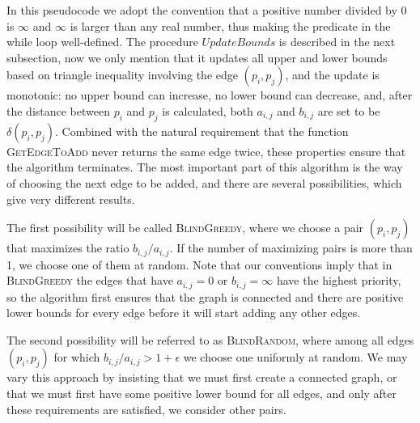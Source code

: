 \documentclass[a4paper,USenglish]{socg-lipics-v2018}
\newcommand{\eps}{\epsilon}
\newcommand{\dist}{\delta}
\begin{document}
\begin{algorithmic}
\label{alg:blind_spanner}
\Function{BlindSpanner}{$P, \eps$}
    \While {$\exists i \neq j : b_{i,j} / a_{i,j} > 1 + \eps$}
        \State {$(i,j) \gets$ \Call {GetEdgeToAdd}{}
        \State {$v \gets \dist(p_i, pj)$}
        \State {Add weighted edge $(p_i, p_j, v)$ to $G$}
        \State {$UpdateBounds(i, j, v)$}
    \EndWhile
    \State \Return {$G$}
\EndFunction
\end{algorithmic}


In this pseudocode we adopt the convention that a positive number divided by 0 is $\infty$
and $\infty$ is larger than any real number,
thus making the predicate in the while loop well-defined.  The procedure $UpdateBounds$ is described in the next subsection,
now we only mention that it updates all upper and lower bounds based on triangle inequality involving the edge $(p_i, p_j)$,
and the update is monotonic: no upper bound can increase, no lower bound can decrease, and, after the distance
between $p_i$ and $p_j$ is calculated, both $a_{i,j}$ and  $b_{i,j}$ are set to be $\dist(p_i, p_j)$.
Combined with the natural requirement that the function \textsc{GetEdgeToAdd} never
returns the same edge twice, these properties ensure that the algorithm terminates.
The most important part of this algorithm is the way of choosing the next edge to be added, and
there are several possibilities, which give very different results.




The first possibility will be called \textsc{BlindGreedy}, where we choose a pair $(p_i, p_j)$ that maximizes
the ratio $b_{i,j} / a_{i,j}$. If the number of maximizing pairs is more than 1, we choose one of them at random.
Note that our conventions imply that in \textsc{BlindGreedy} the edges that have $a_{i,j} = 0$ or $b_{i,j} = \infty$
have the highest priority, so the algorithm first ensures that the graph is connected and there are positive
lower bounds for every edge before it will start adding any other edges.



The second possibility will be referred to as \textsc{BlindRandom}, where among all edges $(p_i, p_j)$
for which $b_{i,j} / a_{i,j} > 1 + \eps$ we choose one uniformly at random. We may vary this approach
by insisting that we must first create a connected graph, or that we must first have some positive lower bound
for all edges, and only after these requirements are satisfied, we consider other pairs.
\end{document}
